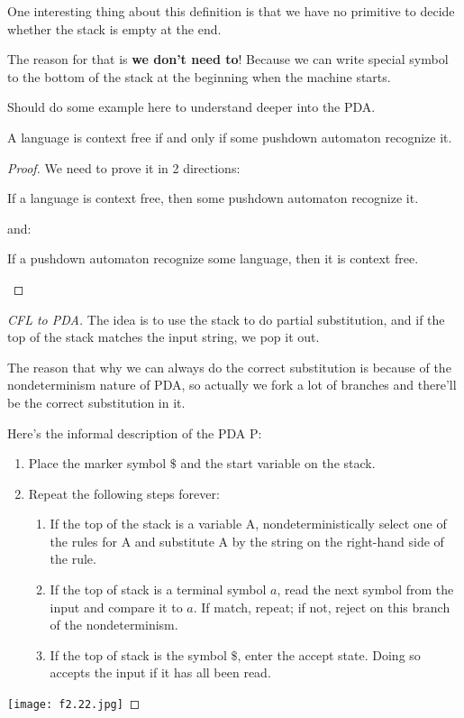 One interesting thing about this definition is that we have no primitive to decide whether the stack is empty at the end.

The reason for that is \textbf{we don't need to}! Because we can write special symbol to the bottom of the stack at the beginning when the machine starts.

\begin{remark}
    Should do some example here to understand deeper into the PDA.   
\end{remark}

\begin{theorem}\label{theorem: CFG=PDA}
    A language is context free if and only if some pushdown automaton recognize it.
\end{theorem}
\begin{proof}
    We need to prove it in 2 directions:
    \begin{lemma}\label{lemma: 4-1}
        If a language is context free, then some pushdown automaton recognize it.
    \end{lemma}
    and:
    \begin{lemma}\label{lemma: 4-2}
        If a pushdown automaton recognize some language, then it is context free.
    \end{lemma}
\end{proof}
\begin{proof}[CFL to PDA]
    The idea is to use the stack to do partial substitution, and if the top of the stack matches the input string, we pop it out.
    
    The reason that why we can always do the correct substitution is because of the nondeterminism nature of PDA, so actually we fork a lot of branches and there'll be the correct substitution in it.

    Here's the informal description of the PDA P:
    \begin{enumerate}
        \item Place the marker symbol \(\$\) and the start variable on the stack.
        \item Repeat the following steps forever:
        \begin{enumerate}
            \item If the top of the stack is a variable A, nondeterministically select one of the rules for A and substitute A by the string on the right-hand side of the rule.
            \item If the top of stack is a terminal symbol \(a\), read the next symbol from the input and compare it to \(a\). If match, repeat; if not, reject on this branch of the nondeterminism.
            \item If the top of stack is the symbol \(\$\), enter the accept state. Doing so accepts the input if it has all been read. 
        \end{enumerate}
    \end{enumerate}

    \texttt{[image: f2.22.jpg]}

\end{proof}
